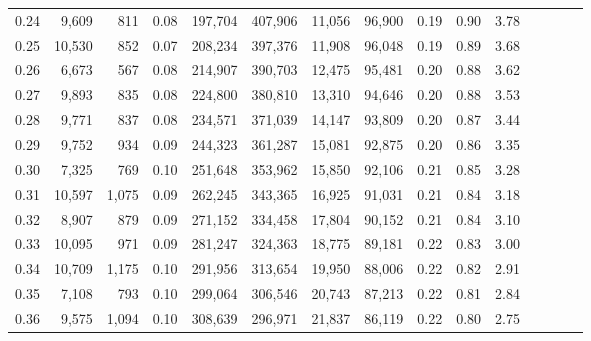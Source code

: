 \begin{tabular}{rrrcrrrrrrrrrrr}
0.24 &   9,609 &    811 &                                       0.08 &  197,704 &  407,906 &   11,056 &   96,900 &  0.19 &  0.90 &                         3.78 \\
0.25 &  10,530 &    852 &                                       0.07 &  208,234 &  397,376 &   11,908 &   96,048 &  0.19 &  0.89 &                         3.68 \\
0.26 &   6,673 &    567 &                                       0.08 &  214,907 &  390,703 &   12,475 &   95,481 &  0.20 &  0.88 &                         3.62 \\
0.27 &   9,893 &    835 &                                       0.08 &  224,800 &  380,810 &   13,310 &   94,646 &  0.20 &  0.88 &                         3.53 \\
0.28 &   9,771 &    837 &                                       0.08 &  234,571 &  371,039 &   14,147 &   93,809 &  0.20 &  0.87 &                         3.44 \\
0.29 &   9,752 &    934 &                                       0.09 &  244,323 &  361,287 &   15,081 &   92,875 &  0.20 &  0.86 &                         3.35 \\
0.30 &   7,325 &    769 &                                       0.10 &  251,648 &  353,962 &   15,850 &   92,106 &  0.21 &  0.85 &                         3.28 \\
0.31 &  10,597 &  1,075 &                                       0.09 &  262,245 &  343,365 &   16,925 &   91,031 &  0.21 &  0.84 &                         3.18 \\
0.32 &   8,907 &    879 &                                       0.09 &  271,152 &  334,458 &   17,804 &   90,152 &  0.21 &  0.84 &                         3.10 \\
0.33 &  10,095 &    971 &                                       0.09 &  281,247 &  324,363 &   18,775 &   89,181 &  0.22 &  0.83 &                         3.00 \\
0.34 &  10,709 &  1,175 &                                       0.10 &  291,956 &  313,654 &   19,950 &   88,006 &  0.22 &  0.82 &                         2.91 \\
0.35 &   7,108 &    793 &                                       0.10 &  299,064 &  306,546 &   20,743 &   87,213 &  0.22 &  0.81 &                         2.84 \\
0.36 &   9,575 &  1,094 &                                       0.10 &  308,639 &  296,971 &   21,837 &   86,119 &  0.22 &  0.80 &                         2.75 \\

\end{tabular}

